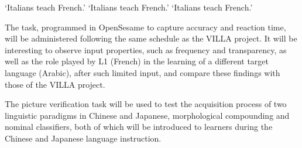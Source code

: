 \documentclass[output=paper,colorlinks,citecolor=brown,modfonts,nonflat]{../langscibook}
\begin{document}
\ea%
    \label{ex:watorek:7}
        \glt    ‘Italians teach French.’
        \glt    ‘Italians teach French.’
        \glt    ‘Italians teach French.’
    \z
\z

The task, programmed in OpenSesame to capture accuracy and reaction time, will be administered following the same schedule as the VILLA project. It will be interesting to observe input properties, such as frequency and transparency, as well as the role played by L1 (French) in the learning of a different target language (Arabic), after such limited input, and compare these findings with those of the VILLA project.

\label{sec:watorek:4.2.2.2}

The picture verification task will be used to test the acquisition process of two linguistic paradigms in Chinese and Japanese, morphological compounding and nominal classifiers, both of which will be introduced to learners during the Chinese and Japanese language instruction.
\end{document}
